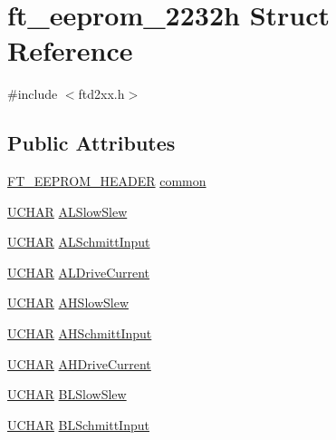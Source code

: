 \hypertarget{structft__eeprom__2232h}{
\section{ft\_\-eeprom\_\-2232h Struct Reference}
\label{structft__eeprom__2232h}
}


{\ttfamily \#include $<$ftd2xx.h$>$}\subsection*{Public Attributes}
\begin{DoxyCompactItemize}
\item 
\hyperlink{structft__eeprom__header}{FT\_\-EEPROM\_\-HEADER} \hyperlink{structft__eeprom__2232h_a9b818fef5106306f0fb8456979164d4e}{common}
\item 
\hyperlink{LALUsbx64_2include_2WinTypes_8h_a4f4bb67531a9bf6f0b9c6ad76aeba587}{UCHAR} \hyperlink{structft__eeprom__2232h_a202255f5052272a7807e17fd5d580438}{ALSlowSlew}
\item 
\hyperlink{LALUsbx64_2include_2WinTypes_8h_a4f4bb67531a9bf6f0b9c6ad76aeba587}{UCHAR} \hyperlink{structft__eeprom__2232h_aabf6af90bb51868803bb93b09f45d6fd}{ALSchmittInput}
\item 
\hyperlink{LALUsbx64_2include_2WinTypes_8h_a4f4bb67531a9bf6f0b9c6ad76aeba587}{UCHAR} \hyperlink{structft__eeprom__2232h_add083043190baacddfb71891e65f0e35}{ALDriveCurrent}
\item 
\hyperlink{LALUsbx64_2include_2WinTypes_8h_a4f4bb67531a9bf6f0b9c6ad76aeba587}{UCHAR} \hyperlink{structft__eeprom__2232h_acfcd2fc032788785109a3f6cf48541a9}{AHSlowSlew}
\item 
\hyperlink{LALUsbx64_2include_2WinTypes_8h_a4f4bb67531a9bf6f0b9c6ad76aeba587}{UCHAR} \hyperlink{structft__eeprom__2232h_abeb4cedf9e0a7ff67cba78e20d1c9c53}{AHSchmittInput}
\item 
\hyperlink{LALUsbx64_2include_2WinTypes_8h_a4f4bb67531a9bf6f0b9c6ad76aeba587}{UCHAR} \hyperlink{structft__eeprom__2232h_a66a0e83f79b8ab08e2b7ae6dad6a6ab9}{AHDriveCurrent}
\item 
\hyperlink{LALUsbx64_2include_2WinTypes_8h_a4f4bb67531a9bf6f0b9c6ad76aeba587}{UCHAR} \hyperlink{structft__eeprom__2232h_ac04377c073041676bf56e25152572952}{BLSlowSlew}
\item 
\hyperlink{LALUsbx64_2include_2WinTypes_8h_a4f4bb67531a9bf6f0b9c6ad76aeba587}{UCHAR} \hyperlink{structft__eeprom__2232h_a5f44424e437a8f95a08123f35c813e17}{BLSchmittInput}
\item 

\end{DoxyCompactItemize}
